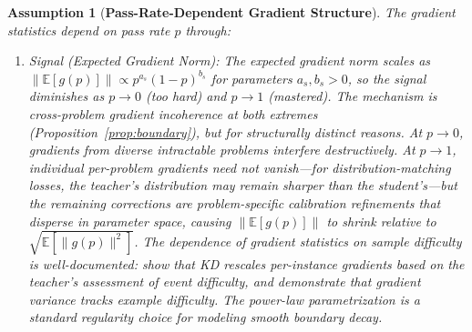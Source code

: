 \documentclass{article}
\newtheorem{assumption}{Assumption}
\begin{document}
\begin{assumption}[\textbf{Pass-Rate-Dependent Gradient Structure}]
\label{asm:passrate_structure}
The gradient statistics depend on pass rate $p$ through:
\begin{enumerate}
 \item[(a)] \emph{Signal (Expected Gradient Norm):} The expected gradient norm scales as $\|\mathbb{E}[g(p)]\| \propto p^{a_s}(1-p)^{b_s}$ for parameters $a_s, b_s > 0$, so the signal diminishes as $p \to 0$ (too hard) and $p \to 1$ (mastered). The mechanism is \emph{cross-problem gradient incoherence} at both extremes (Proposition~\ref{prop:boundary}), but for structurally distinct reasons. At $p \to 0$, gradients from diverse intractable problems interfere destructively. At $p \to 1$, individual per-problem gradients need not vanish---for distribution-matching losses, the teacher's distribution may remain sharper than the student's---but the remaining corrections are problem-specific calibration refinements that disperse in parameter space, causing $\|\mathbb{E}[g(p)]\|$ to shrink relative to $\sqrt{\mathbb{E}[\|g(p)\|^2]}$. The dependence of gradient statistics on sample difficulty is well-documented: \citet{tang2020understanding} show that KD rescales per-instance gradients based on the teacher's assessment of event difficulty, and \citet{agarwal2022vog} demonstrate that gradient variance tracks example difficulty. The power-law parametrization is a standard regularity choice for modeling smooth boundary decay.


\end{enumerate}
\end{assumption}
\end{document}
